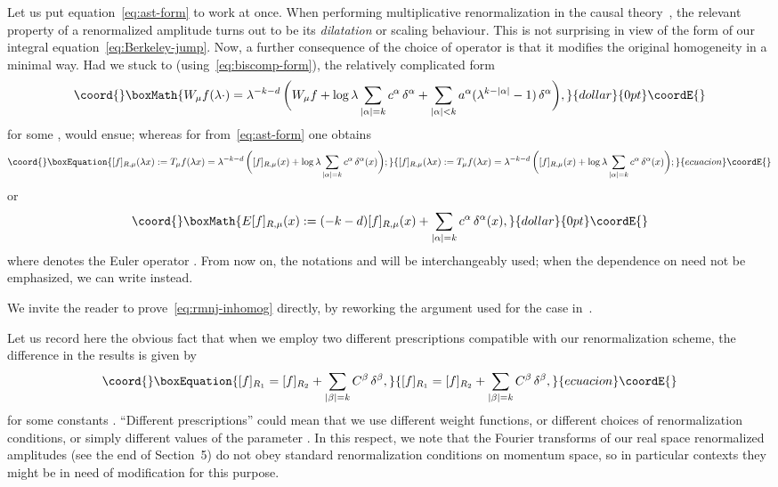 \documentclass[a4paper,12pt]{article}
\renewcommand{\a}{\alpha}          %
\renewcommand{\b}{\beta}           %
\providecommand{\del}{\partial}        %
\providecommand{\dl}{\delta}           %
\providecommand{\la}{\lambda}          %
\providecommand{\7}{\dagger}           %
\theoremstyle{plain}
\theoremstyle{definition}
\begin{document}
Let us put equation~\eqref{eq:ast-form} to work at once. When
performing multiplicative renormalization in the causal
theory~\cite{Flora}, the relevant property of a renormalized amplitude
turns out to be its \textit{dilatation} or scaling behaviour. This is
not surprising in view of the form of our integral
equation~\eqref{eq:Berkeley-jump}. Now, a further consequence of the
choice of operator \coordHE{} is that it modifies the original homogeneity
in a minimal way. Had we stuck to \coordHE{}
(using~\eqref{eq:biscomp-form}), the relatively complicated form
$$\coord{}\boxMath{
W_\mu f(\la\cdot) = \la^{-k-d} \, \biggl( W_\mu f
+ \log\la \sum_{|\a|=k} c^\a \,\dl^\a +
\sum_{|\a|<k} a^\a (\la^{k-|\a|} - 1) \,\dl^\a \biggr),
}{dollar}{0pt}\coordE{}$$
for some \myHighlight{$a^\a$}\coordHE{}, would ensue; whereas for \coordHE{}
{}from~\eqref{eq:ast-form} one obtains
\begin{equation}\coord{}\boxEquation{
[f]_{R,\mu}(\la x) := T_\mu f(\la x) =
\la^{-k-d} \, \biggl([f]_{R,\mu}(x)
+ \log\la \sum_{|\a|=k} c^\a\,\dl^\a(x) \biggr);
\label{eq:rmnj-inhomog}
}{
[f]_{R,\mu}(\la x) := T_\mu f(\la x) =
\la^{-k-d} \, \biggl([f]_{R,\mu}(x)
+ \log\la \sum_{|\a|=k} c^\a\,\dl^\a(x) \biggr);
}{ecuacion}\coordE{}\end{equation}
or
$$\coord{}\boxMath{
E[f]_{R,\mu}(x) :=
(-k-d) [f]_{R,\mu}(x) + \sum_{|\a|=k} c^\a\,\dl^\a(x),
}{dollar}{0pt}\coordE{}$$
where \coordHE{} denotes the Euler operator \myHighlight{$\sum_{|\b|=1} x^\b \del^\b$}\coordHE{}.
 From now on, the notations \coordHE{} and \coordHE{} will be
interchangeably used; when the dependence on \myHighlight{$\mu$}\coordHE{} need not be
emphasized, we can write \coordHE{} instead.

We invite the reader to prove~\eqref{eq:rmnj-inhomog} directly, by
reworking the argument used for the case \coordHE{}
in~\cite[pp.~307--308]{Polaris}.

Let us record here the obvious fact that when we employ two different
prescriptions compatible with our renormalization scheme, the
difference in the results is given by
\begin{equation}\coord{}\boxEquation{
[f]_{R_1} = [f]_{R_2} + \sum_{|\b|=k} C^\b\,\dl^\b,
\label{eq:start-eq}
}{
[f]_{R_1} = [f]_{R_2} + \sum_{|\b|=k} C^\b\,\dl^\b,
}{ecuacion}\coordE{}\end{equation}
for some constants \myHighlight{$C^\b$}\coordHE{}. ``Different prescriptions'' could mean that
we use different weight functions, or different choices of
renormalization conditions, or simply different values of the parameter
\myHighlight{$\mu$}\coordHE{}. In this respect, we note that the Fourier transforms of our
real space renormalized amplitudes (see the end of Section~5) do not
obey standard renormalization conditions on momentum space, so in
particular contexts they might be in need of modification for this
purpose.
\end{document}
